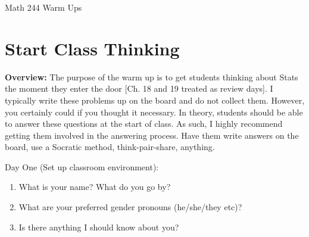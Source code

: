 \documentclass[12pt]{amsart}
\date{}
\theoremstyle{definition}
\begin{document}
\newcommand{\ph}{\phantom}
\newcommand{\ds}{\displaystyle}

\renewcommand{\emph}{\textbf}
\onehalfspace


\fancyhf{}   %
\renewcommand{\headrulewidth}{0.4pt} %
\fancyfootoffset[LE,LO]{0in}        %
\renewcommand{\footrulewidth}{0.4pt} %




\begin{center}

	\larger[3]	Math 244 Warm Ups \smaller[3]		\\[22pt]

\end{center}

\section*{Start Class Thinking}




 \textbf{Overview:} The purpose of the warm up is to get students thinking about Stats the moment they enter the door [Ch. 18 and 19 treated as review days]. I typically write these problems up on the board and do not collect them. However, you certainly could if you thought it necessary. In theory, students should be able to answer these questions at the start of class. As such, I highly recommend getting them involved in the answering process. Have them write answers on the board, use a Socratic method, think-pair-share, anything.\\
 \begin{framed}
 Day One (Set up classroom environment):
 \begin{enumerate}
 \item What is your name? What do you go by?
 \item What are your preferred gender pronouns (he/she/they etc)? 
 \item Is there anything I should know about you?
 \end{enumerate}
 \end{framed}
 
\end{document}
